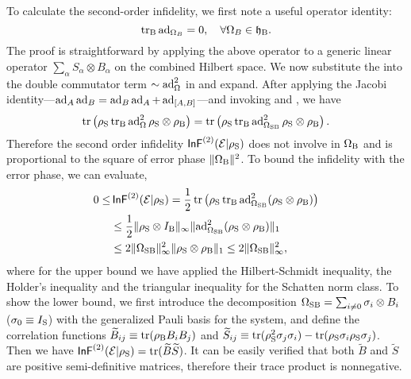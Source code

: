 \documentclass[pra,reprint,superscriptaddress]{revtex4-2}
\begin{document}
To calculate the second-order infidelity, we first note a useful operator identity:
\begin{equation}\label{eq:trBad}
    \operatorname{\operatorname{tr}_\mathrm{B}} \operatorname{ad}_{\Omega_B} = 0,\quad \forall \Omega_B \in \mathfrak{h}_{\mathrm{B}}.
\end{equation}
The proof is straightforward by applying the above operator to a generic linear operator $\sum_\alpha S_\alpha \otimes B_\alpha$ on the combined Hilbert space.
We now substitute the  into the double commutator term $\sim\operatorname{ad}_{\Omega}^2$ in   and expand. After applying
the Jacobi identity---$\operatorname{ad}_{A}\operatorname{ad}_{B}=\operatorname{ad}_{B}\operatorname{ad}_{A}+\operatorname{ad}_{[A,B]}$---and invoking
  and , we have
\begin{equation}
\operatorname{tr}\left( \rho_{\mathrm{S}} \operatorname{\operatorname{tr}_\mathrm{B}} \operatorname{ad}^2_{\Omega} \rho_{\mathrm{S}}\otimes\rho_{\mathrm{B}}\right) =  \operatorname{tr}\left( \rho_{\mathrm{S}} \operatorname{\operatorname{tr}_\mathrm{B}} \operatorname{ad}^2_{\Omega_{\mathrm{SB}}} \rho_{\mathrm{S}}\otimes\rho_{\mathrm{B}}\right).
\end{equation}
Therefore the second order infidelity $\operatorname{\mathsf{InF}}^{(2)}(\mathcal{E}|\rho_{\mathrm{S}})$ does not involve in $\Omega_{\mathrm{B}}$ and is proportional to the square of error phase $\Vert {\Omega_{\mathrm{B}}} \Vert^2$.
To bound the infidelity with the error phase, we can evaluate,
\begin{equation}\label{eq:infid2-bound}
\begin{aligned}
    0\le& \operatorname{\mathsf{InF}}^{(2)}(\mathcal{E}|\rho_{\mathrm{S}}) =   \frac{1}{2}  \operatorname{tr}\left( \rho_{\mathrm{S}} \operatorname{\operatorname{tr}_\mathrm{B}} \operatorname{ad}^2_{\Omega_{\mathrm{SB}}}(\rho_{\mathrm{S}}\otimes\rho_{\mathrm{B}})\right)\\
&\le \frac{1}{2}\Vert {\rho_\mathrm{S}\otimes I_{\mathrm{B}}} \Vert_\infty \Vert {\operatorname{ad}^2_{\Omega_{\mathrm{SB}}} (\rho_{\mathrm{S}}\otimes\rho_{\mathrm{B}})} \Vert_1\\
&\le 2 \Vert {\Omega_{\mathrm{SB}}} \Vert_\infty^2 \Vert {\rho_\mathrm{S}\otimes\rho_\mathrm{B}} \Vert_1 \le 2\Vert {\Omega_{\mathrm{SB}}} \Vert_\infty^2,
\end{aligned}   
\end{equation}
where for the upper bound we have applied the Hilbert-Schmidt inequality, the Holder's inequality and the triangular inequality for the Schatten norm class.
To show the lower bound, we first introduce the decomposition $\Omega_{\mathrm{SB}} = \sum_{i\neq 0}\sigma_i \otimes B_i$  ($\sigma_0\equiv I_{\mathrm{S}}$) with the generalized Pauli basis for the system, and define the correlation functions 
$\widetilde{B}_{ij} \equiv \operatorname{tr}(\rho_{\mathrm{B}} B_i B_j)$ and $\widetilde{S}_{ij} \equiv \operatorname{tr}(\rho_\mathrm{S}^2 \sigma_j\sigma_i) -\operatorname{tr}(\rho_\mathrm{S} \sigma_i \rho_\mathrm{S} \sigma_j)$. 
Then we have $\operatorname{\mathsf{InF}}^{(2)}(\mathcal{E}|\rho_{\mathrm{S}}) = \operatorname{tr}(\widetilde{B} \widetilde{S})$.
It can be easily verified that both $\widetilde{B}$ and $\widetilde{S}$ are positive semi-definitive matrices, therefore their trace product is nonnegative.
\end{document}
